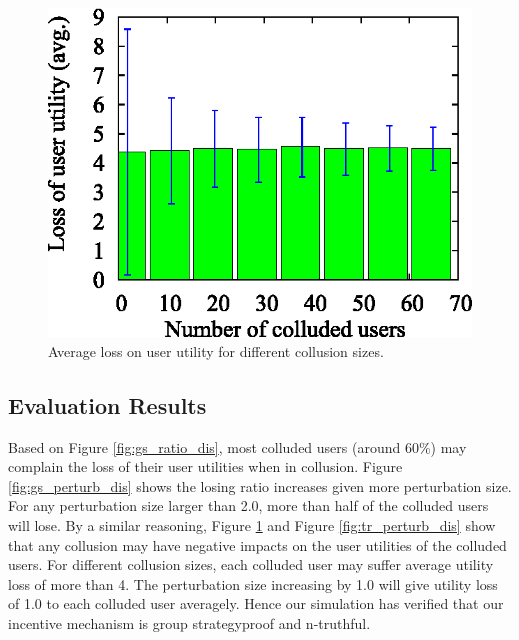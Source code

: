 \documentclass[conference]{IEEEtran}
\theoremstyle{definition}
\begin{document}
\begin{figure}[!t]
\begin{minipage}{0.3\textwidth}
\label{fig:gs_perturb_dis}
\end{minipage}
\hspace{0.01cm}
\begin{minipage}{0.3\textwidth}
\includegraphics[width=\textwidth]{collusion_resist_codes/images/img_tr_loss_dis.eps}
\caption{Average loss on user utility for different collusion sizes.}
\label{fig:tr_ratio_dis}
\end{minipage}
\end{figure}

\subsection{\color{black}Evaluation Results}
Based on Figure \ref{fig:gs_ratio_dis}, most colluded users (around 60\%) may complain the loss of their user utilities when in collusion. %
Figure \ref{fig:gs_perturb_dis} shows the losing ratio increases given more perturbation size. For any perturbation size larger than 2.0, more than half of the colluded users will lose. By a similar reasoning, Figure \ref{fig:tr_ratio_dis} and Figure \ref{fig:tr_perturb_dis} show that any collusion may have negative impacts on the user utilities of the colluded users. For different collusion sizes, each colluded user may suffer average utility loss of more than 4. The perturbation size increasing by 1.0 will give utility loss of 1.0 to each colluded user averagely. Hence our simulation has verified that our {\color{black}incentive mechanism} is group strategyproof and n-truthful.
\end{document}

